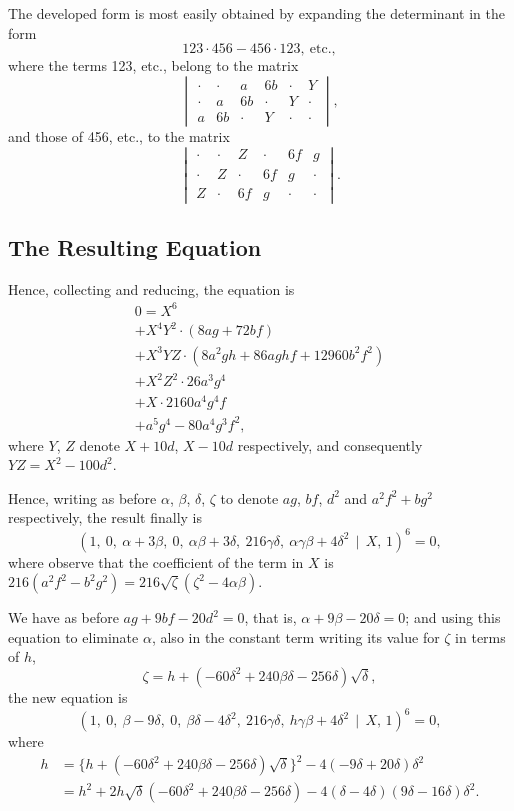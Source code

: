 \documentclass[11pt,a4paper]{book}
\begin{document}
The developed form is most easily obtained by expanding the determinant in the form
\[
123 \cdot 456 - 456 \cdot 123,\ \text{etc.},
\]
where the terms 123, etc., belong to the matrix
\[
\begin{vmatrix}
\cdot & \cdot & a & 6b & \cdot & Y \\
\cdot & a & 6b & \cdot & Y & \cdot \\
a & 6b & \cdot & Y & \cdot & \cdot
\end{vmatrix},
\]
and those of 456, etc., to the matrix
\[
\begin{vmatrix}
\cdot & \cdot & Z & \cdot & 6f & g \\
\cdot & Z & \cdot & 6f & g & \cdot \\
Z & \cdot & 6f & g & \cdot & \cdot
\end{vmatrix}.
\]

\subsection*{The Resulting Equation}

Hence, collecting and reducing, the equation is
\begin{multline*}
0 = X^{6} \\
+ X^{4}Y^{2} \cdot (8ag + 72bf) \\
+ X^{3}YZ \cdot (8a^{2}gh + 86aghf + 12960b^{2}f^{2}) \\
+ X^{2}Z^{2} \cdot 26a^{3}g^{4} \\
+ X \cdot 2160a^{4}g^{4}f \\
+ a^{5}g^{4} - 80a^{4}g^{3}f^{2},
\end{multline*}
where $Y$, $Z$ denote $X+10d$, $X-10d$ respectively, and consequently $YZ = X^{2} - 100d^{2}$.

Hence, writing as before $\alpha$, $\beta$, $\delta$, $\zeta$ to denote $ag$, $bf$, $d^{2}$ and $a^{2}f^{2} + bg^{2}$ respectively, the result finally is
\[
(1,\ 0,\ \alpha+3\beta,\ 0,\ \alpha\beta+3\delta,\ 216\gamma\delta,\ \alpha\gamma\beta+4\delta^{2} \,\!\!\mid\!\!\, X,\, 1)^{6} = 0,
\]
where observe that the coefficient of the term in $X$ is $216(a^{2}f^{2} - b^{2}g^{2}) = 216\sqrt{\zeta}(\zeta^{2} - 4\alpha\beta)$.

We have as before $ag + 9bf - 20d^{2} = 0$, that is, $\alpha + 9\beta - 20\delta = 0$; and using this equation to eliminate $\alpha$, also in the constant term writing its value for $\zeta$ in terms of $h$,
\[
\zeta = h + (-60\delta^{2} + 240\beta\delta - 256\delta)\sqrt{\delta},
\]
the new equation is
\[
(1,\ 0,\ \beta-9\delta,\ 0,\ \beta\delta-4\delta^{2},\ 216\gamma\delta,\ h\gamma\beta+4\delta^{2} \,\!\!\mid\!\!\, X,\, 1)^{6} = 0,
\]
where
\begin{align*}
h &= \{h + (-60\delta^{2} + 240\beta\delta - 256\delta)\sqrt{\delta}\}^{2} - 4(-9\delta + 20\delta)\delta^{2} \\
&= h^{2} + 2h\sqrt{\delta}(-60\delta^{2} + 240\beta\delta - 256\delta) - 4(\delta - 4\delta)(9\delta - 16\delta)\delta^{2}.
\end{align*}
\end{document}
